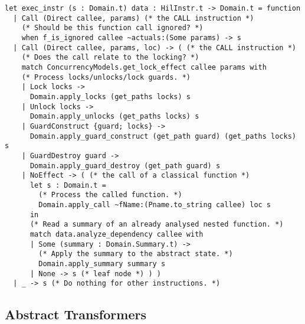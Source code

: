 \begin{lstlisting}[style=ocaml, label={list:AITransform}, float=hbt, caption={The implementation of the \emph{abstract transformers} (also called \emph{transfer functions})}]
let exec_instr (s : Domain.t) data : HilInstr.t -> Domain.t = function
  | Call (Direct callee, params) (* the CALL instruction *)
    (* Should be this function call ignored? *)
    when f_is_ignored callee ~actuals:(Some params) -> s
  | Call (Direct callee, params, loc) -> ( (* the CALL instruction *)
    (* Does the call relate to the locking? *)
    match ConcurrencyModels.get_lock_effect callee params with
    (* Process locks/unlocks/lock guards. *)
    | Lock locks ->
      Domain.apply_locks (get_paths locks) s
    | Unlock locks ->
      Domain.apply_unlocks (get_paths locks) s
    | GuardConstruct {guard; locks} ->
      Domain.apply_guard_construct (get_path guard) (get_paths locks) s
    | GuardDestroy guard ->
      Domain.apply_guard_destroy (get_path guard) s
    | NoEffect -> ( (* the call of a classical function *)
      let s : Domain.t =
        (* Process the called function. *)
        Domain.apply_call ~fName:(Pname.to_string callee) loc s
      in
      (* Read a summary of an already analysed nested function. *)
      match data.analyze_dependency callee with
      | Some (summary : Domain.Summary.t) ->
        (* Apply the summary to the abstract state. *)
        Domain.apply_summary summary s
      | None -> s (* leaf node *) ) )
  | _ -> s (* Do nothing for other instructions. *)
\end{lstlisting}

\subsection{Abstract Transformers}

